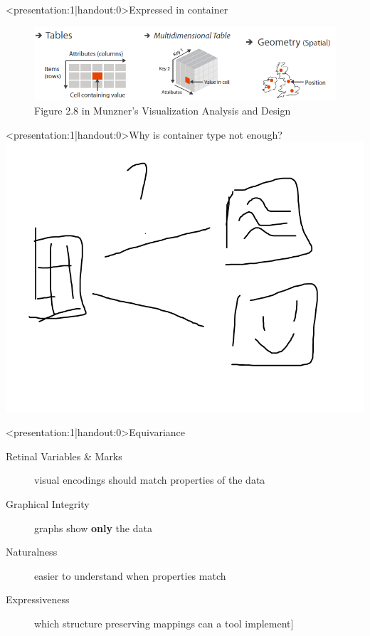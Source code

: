 \documentclass[xcolor={dvipsnames}, handout]{beamer}
\begin{document}
\begin{frame}<presentation:1|handout:0>{Expressed in container} 
    \begin{figure}
        \includegraphics[width=1\textwidth]{figures/intro/munzner_datatypes.png}
        \caption{Figure 2.8 in Munzner's Visualization Analysis and Design\cite{munznerVisualizationAnalysisDesign2014}}
    \end{figure}
\end{frame}

\begin{frame}<presentation:1|handout:0>{Why is container type not enough?}
    \includegraphics[width=1\linewidth]{../paper/figures/whycontinuity.png}
\end{frame}

\begin{frame}<presentation:1|handout:0>{Equivariance}
    \begin{description}
        \item[Retinal Variables \& Marks] visual encodings should match properties of the data \cite{bertinSemiologyGraphicsDiagrams2011a}
        \pause
        \item[Graphical Integrity] graphs show \textbf{only} the data\cite{tufteVisualDisplayQuantitative2001}
        \pause 
        \item[Naturalness] easier to understand when properties match\cite{norman_things_smart}
        \pause
        \item[Expressiveness] which structure preserving mappings can a tool implement\cite{mackinlayAutomatingDesignGraphical1986}] 
    \end{description}
\end{frame}
\end{document}
